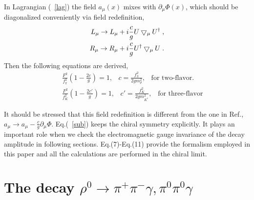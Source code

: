 In Lagrangian (~\ref{lag}) the field $a_{\mu}(x)$ mixes with
$\partial_\mu{\Phi(x)}$, which 
should be diagonalized conveniently via field redefinition,
\begin{eqnarray}\label{sub}
 L_\mu \rightarrow L_\mu +i\frac{c}{g}U\bigtriangledown_\mu U^\dagger\;, \nonumber\\
 R_\mu \rightarrow R_\mu +i\frac{c}{g}U^\dagger \bigtriangledown_\mu U\;. 
\end{eqnarray}
Then the following equations are derived,
\begin{eqnarray}
& &\frac{F^2}{f_\pi^2}(1-\frac{2c}{g})=1,\;\;\;
c=\frac{f_\pi^2}{2gm_\rho^2},\;\;\;\mbox{for two-flavor}.\\
& &\frac{F^2}{f_K^2}(1-\frac{2c'}{g})=1,\;\;\;
c'=\frac{f_K^2}{2gm_{K^*}^2},\;\;\;\mbox{for three-flavor}
\end{eqnarray}

It should be stressed that this field redefinition is different from
the one in Ref.\cite{Li1}, $a_\mu \rightarrow
a_\mu-\frac{c}{g}\partial_\mu\Phi$. Eq.(~\ref{sub}) keeps the chiral
symmetry explicitly. It plays an important role when we
check the electromagnetic gauge invariance of the decay amplitude in
following sections. Eq.(7)-Eq.(11) provide the formalism employed in this
paper and all the calculations are performed in the chiral limit.

\section{The decay $\rho^0 \rightarrow \pi^+\pi^-\gamma,\pi^0\pi^0\gamma$}

